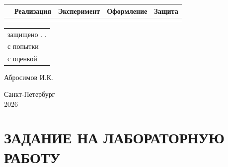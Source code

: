 \documentclass[14pt,a4paper]{extarticle}
\begin{document}
\begin{titlepage}
    \noindent
    \begin{minipage}[c]{0.70\textwidth}
        \renewcommand{\arraystretch}{1.2}
        \begin{tabularx}{\textwidth}{|>{\centering\arraybackslash}X|>{\centering\arraybackslash}X|>{\centering\arraybackslash}X|>{\centering\arraybackslash}X|>{\centering\arraybackslash}X|}
            \hline
            {\fontsize{10pt}{12pt}\selectfont Теория} & 
            {\fontsize{10pt}{12pt}\selectfont Реализация} & 
            {\fontsize{10pt}{12pt}\selectfont Эксперимент} & 
            {\fontsize{10pt}{12pt}\selectfont Оформление} & 
            {\fontsize{10pt}{12pt}\selectfont Защита} \\
            \hline
            \rule{0pt}{1.0cm} & & & & \\ 
            \hline
        \end{tabularx}
    \end{minipage}
    \hfill
    \begin{minipage}[c]{0.28\textwidth}
        \begin{tabular}{@{}l@{}}
            защищено \underline{\hspace{0.4cm}} . \underline{\hspace{0.4cm}} . \underline{\hspace{0.8cm}} \\[0.1cm] 
            с \underline{\hspace{2.2cm}} попытки \\[0.1cm] 
            с оценкой \underline{\hspace{2.2cm}}
        \end{tabular}
    \end{minipage}

    \vspace{1cm}

    \noindent
     \hfill \underline{\hspace{6cm}} \hspace{0.3cm} Абросимов И.К.

    \vfill
    \begin{center}
        Санкт-Петербург \\
        2026
    \end{center}
\end{titlepage}

\newpage
\section*{ЗАДАНИЕ НА ЛАБОРАТОРНУЮ РАБОТУ}
\end{document}
